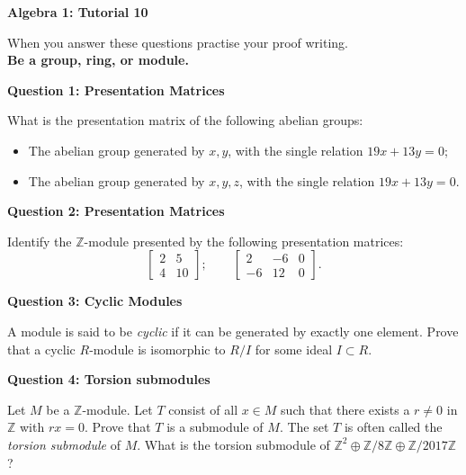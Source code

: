 \documentclass[11pt,twoside, a4paper]{report}
\theoremstyle{plain}
\theoremstyle{definition}
\begin{document}
\begin{center}
 \noindent\makebox[\linewidth]{\rule{14cm}{1.5pt}} 
{\bf Algebra 1: Tutorial 10 }
 \noindent\makebox[\linewidth]{\rule{14cm}{1.5pt}}  
 \noindent\makebox[\linewidth]{\rule{14cm}{3pt}}
\end{center}

\noindent When you answer these questions practise your proof writing.\\
  {\bf Be a group, ring, or module.}
  
 
\begin{center}
{\bf Question 1: Presentation Matrices}
\end{center}

What is the presentation matrix of the following abelian groups:
\begin{itemize}
\item The abelian group generated by $x,y$, with the single relation $19x+13y=0$;
\item The abelian group generated by $x,y,z$, with the single relation $19x+13y=0$.
\end{itemize}


\begin{center}
{\bf Question 2: Presentation Matrices}
\end{center}

Identify the $\mathbb{Z}$-module presented by the following presentation matrices:
\[ \begin{bmatrix}
2 & 5 \\
4 & 10
\end{bmatrix};\qquad
\begin{bmatrix}
2 & -6 & 0 \\
-6 & 12 & 0
\end{bmatrix}. \]

\smallskip


\begin{center}
{\bf Question 3: Cyclic Modules}
\end{center}

A module is said to be \textit{cyclic} if it can be generated by exactly one element. Prove that a cyclic $R$-module is isomorphic to $R/I$ for some ideal $I\subset R$.


\begin{center}
{\bf Question 4: Torsion submodules}
\end{center}

Let $M$ be a $\mathbb{Z}$-module. Let $T$ consist of all $x\in M$ such that there exists a $r\neq0$ in $\mathbb{Z}$ with $rx=0$. Prove that $T$ is a submodule of $M$. The set $T$ is often called the \textit{torsion submodule} of $M$. What is the torsion submodule of $\mathbb{Z}^2\oplus\mathbb{Z}/8\mathbb{Z}\oplus\mathbb{Z}/2017\mathbb{Z}$?
\end{document}
